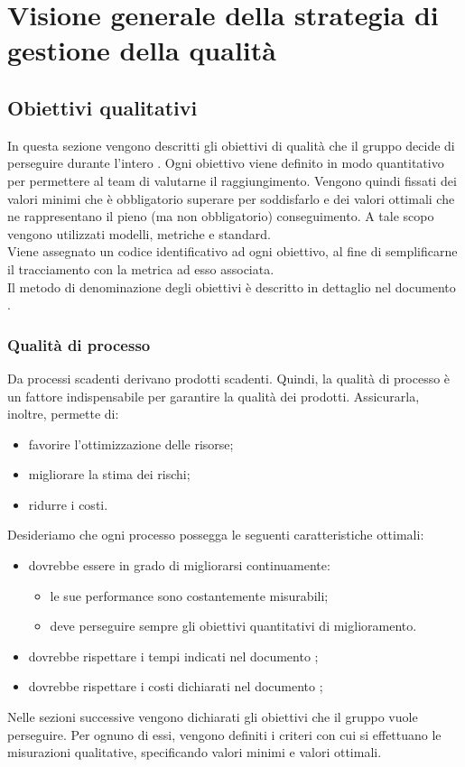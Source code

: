 \documentclass[PianoDiQualifica.tex]{subfiles}
\begin{document}
\section{Visione generale della strategia di gestione della qualità}
	\subsection{Obiettivi qualitativi}
		In questa sezione vengono descritti gli obiettivi di qualità che il gruppo \GRUPPO{} decide di perseguire durante l'intero .
		Ogni obiettivo viene definito in modo quantitativo per permettere al team di valutarne il raggiungimento.
		Vengono quindi fissati dei valori minimi che è obbligatorio superare per soddisfarlo e dei valori ottimali che ne rappresentano il pieno (ma non obbligatorio) conseguimento.
		A tale scopo vengono utilizzati modelli, metriche e standard. \\
		Viene assegnato un codice identificativo ad ogni obiettivo, al fine di semplificarne il tracciamento con la metrica ad esso associata. \\
		Il metodo di denominazione degli obiettivi è descritto in dettaglio nel documento \NPdocRR{}.
		
		\subsubsection{Qualità di processo}
		Da processi scadenti derivano prodotti scadenti. Quindi, la qualità di processo è un fattore indispensabile per garantire la qualità dei prodotti. Assicurarla, inoltre, permette di:
		\begin{itemize}
			\item favorire l'ottimizzazione delle risorse; 
			\item migliorare la stima dei rischi;
			\item ridurre i costi.
		\end{itemize}
		Desideriamo che ogni processo possegga le seguenti caratteristiche ottimali:
		\begin{itemize}
			\item dovrebbe essere in grado di migliorarsi continuamente:
			\begin{itemize}
					\item le sue performance sono costantemente misurabili;
					\item deve perseguire sempre gli obiettivi quantitativi di miglioramento.
			\end{itemize}
			\item dovrebbe rispettare i tempi indicati nel documento \PPdocRR;
			\item dovrebbe rispettare i costi dichiarati nel documento \PPdocRR;
		\end{itemize}
		Nelle sezioni successive vengono dichiarati gli obiettivi che il gruppo vuole perseguire. Per ognuno di essi, vengono definiti i criteri con cui si effettuano le misurazioni qualitative,
		specificando valori minimi e valori ottimali.
\end{document}
